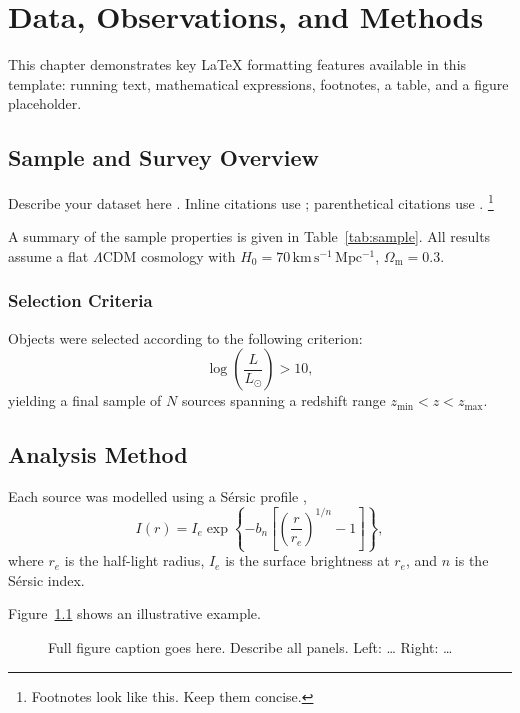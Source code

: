\chapter{Data, Observations, and Methods}

This chapter demonstrates key \LaTeX{} formatting features available in
this template: running text, mathematical expressions, footnotes, a
table, and a figure placeholder.

\section{Sample and Survey Overview}

Describe your dataset here \citep{example:2021}. Inline citations use
\citet{example:2020}; parenthetical citations use
\citep[e.g.,][]{example:2020}.%
\footnote{Footnotes look like this. Keep them concise.}

A summary of the sample properties is given in Table~\ref{tab:sample}.
All results assume a flat $\Lambda$CDM cosmology with
$H_0 = 70\,\mathrm{km\,s^{-1}\,Mpc^{-1}}$, $\Omega_\mathrm{m} = 0.3$.


\subsection{Selection Criteria}

Objects were selected according to the following criterion:
\begin{equation}
    \log \left( \frac{L}{L_\odot} \right) > 10 ,
    \label{eq:selection}
\end{equation}
yielding a final sample of $N$ sources spanning a redshift range
$z_\mathrm{min} < z < z_\mathrm{max}$.


\section{Analysis Method}

Each source was modelled using a S\'{e}rsic profile
\citep{example:2020},
\begin{equation}
    I(r) = I_e \exp\left\{ -b_n \left[
        \left(\frac{r}{r_e}\right)^{1/n} - 1 \right] \right\} ,
    \label{eq:sersic}
\end{equation}
where $r_e$ is the half-light radius, $I_e$ is the surface brightness
at $r_e$, and $n$ is the S\'{e}rsic index.

Figure~\ref{fig:ch2_example} shows an illustrative example.

\begin{figure}[htbp]
    \centering
    \caption[Short caption for list of figures]{Full figure caption goes
        here. Describe all panels. Left: \ldots{} Right: \ldots}
    \label{fig:ch2_example}
\end{figure}


